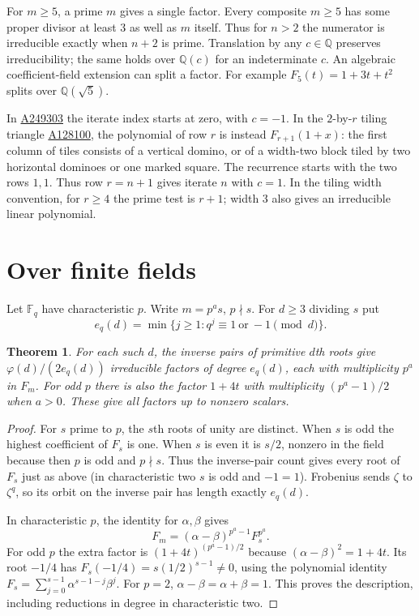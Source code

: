 \documentclass[11pt,letterpaper]{article}
\newtheorem{theorem}{Theorem}
\newcommand{\oeis}[1]{\href{https://oeis.org/A#1}{A#1}}
\begin{document}
For $m\ge5$, a prime $m$ gives a single factor. Every composite $m\ge5$ has some proper divisor at least $3$ as well as $m$ itself. Thus for $n>2$ the numerator is irreducible exactly when $n+2$ is prime. Translation by any $c\in\mathbb Q$ preserves irreducibility; the same holds over $\mathbb Q(c)$ for an indeterminate $c$. An algebraic coefficient-field extension can split a factor. For example $F_5(t)=1+3t+t^2$ splits over $\mathbb Q(\sqrt5)$.

In \oeis{249303} the iterate index starts at zero, with $c=-1$. In the $2$-by-$r$ tiling triangle \oeis{128100}, the polynomial of row $r$ is instead $F_{r+1}(1+x)$: the first column of tiles consists of a vertical domino, or of a width-two block tiled by two horizontal dominoes or one marked square. The recurrence starts with the two rows $1,1$. Thus row $r=n+1$ gives iterate $n$ with $c=1$. In the tiling width convention, for $r\ge4$ the prime test is $r+1$; width $3$ also gives an irreducible linear polynomial.

\section{Over finite fields}
Let $\mathbb F_q$ have characteristic $p$. Write $m=p^a s$, $p\nmid s$. For $d\ge3$ dividing $s$ put
\[
 e_q(d)=\min\{j\ge1:q^j\equiv1\ \text{or}\ -1\pmod d\}.
\]
\begin{theorem}
For each such $d$, the inverse pairs of primitive $d$th roots give $\varphi(d)/(2e_q(d))$ irreducible factors of degree $e_q(d)$, each with multiplicity $p^a$ in $F_m$. For odd $p$ there is also the factor $1+4t$ with multiplicity $(p^a-1)/2$ when $a>0$. These give all factors up to nonzero scalars.
\end{theorem}
\begin{proof}
For $s$ prime to $p$, the $s$th roots of unity are distinct. When $s$ is odd the highest coefficient of $F_s$ is one. When $s$ is even it is $s/2$, nonzero in the field because then $p$ is odd and $p\nmid s$. Thus the inverse-pair count gives every root of $F_s$ just as above (in characteristic two $s$ is odd and $-1=1$). Frobenius sends $\zeta$ to $\zeta^q$, so its orbit on the inverse pair has length exactly $e_q(d)$.

In characteristic $p$, the identity for $\alpha,\beta$ gives
\[
 F_m=(\alpha-\beta)^{p^a-1}F_s^{p^a}.
\]
For odd $p$ the extra factor is $(1+4t)^{(p^a-1)/2}$ because $(\alpha-\beta)^2=1+4t$. Its root $-1/4$ has $F_s(-1/4)=s(1/2)^{s-1}\ne0$, using the polynomial identity $F_s=\sum_{j=0}^{s-1}\alpha^{s-1-j}\beta^j$. For $p=2$, $\alpha-\beta=\alpha+\beta=1$. This proves the description, including reductions in degree in characteristic two.
\end{proof}
\end{document}
